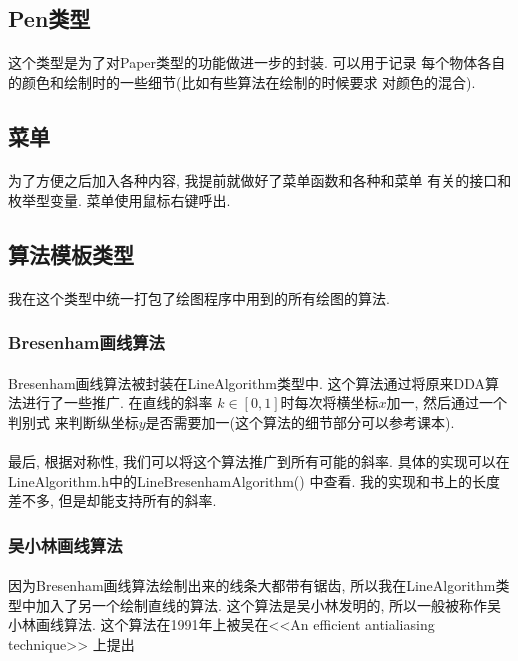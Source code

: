 \documentclass{article}
\begin{document}
	\subsection{Pen类型}
		\paragraph{}
			这个类型是为了对Paper类型的功能做进一步的封装. 可以用于记录
			每个物体各自的颜色和绘制时的一些细节(比如有些算法在绘制的时候要求
			对颜色的混合).
	\subsection{菜单}
		\paragraph{}
			为了方便之后加入各种内容, 我提前就做好了菜单函数和各种和菜单
			有关的接口和枚举型变量. 菜单使用鼠标右键呼出.
	\subsection{算法模板类型}
		\paragraph{}
			我在这个类型中统一打包了绘图程序中用到的所有绘图的算法.	
		\subsubsection{Bresenham画线算法}
			\paragraph{}
				Bresenham画线算法被封装在LineAlgorithm类型中.
				这个算法通过将原来DDA算法进行了一些推广. 在直线的斜率
				$k \in [0, 1]$时每次将横坐标$x$加一, 然后通过一个判别式
				来判断纵坐标$y$是否需要加一(这个算法的细节部分可以参考课本).
			\paragraph{}
				最后, 根据对称性, 我们可以将这个算法推广到所有可能的斜率.
				具体的实现可以在LineAlgorithm.h中的LineBresenhamAlgorithm()
				中查看. 我的实现和书上的长度差不多, 但是却能支持所有的斜率.
		\subsubsection{吴小林画线算法}
			\paragraph{}
				因为Bresenham画线算法绘制出来的线条大都带有锯齿, 
				所以我在LineAlgorithm类型中加入了另一个绘制直线的算法. 
				这个算法是吴小林发明的, 所以一般被称作吴小林画线算法.
				这个算法在1991年上被吴在<<An efficient antialiasing 
				technique>> 上提出
			\clearpage
\end{document}

